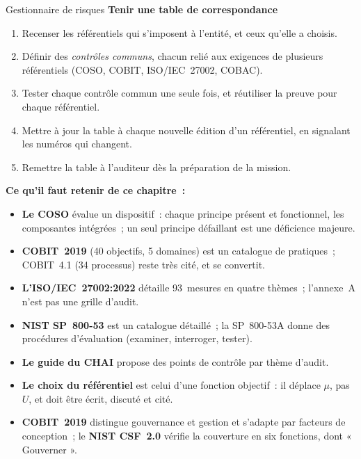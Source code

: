 \begin{boxmetier}{Gestionnaire de risques}
\textbf{Tenir une table de correspondance}
\begin{enumerate}
    \item Recenser les référentiels qui s'imposent à l'entité, et ceux
          qu'elle a choisis.
    \item Définir des \emph{contrôles communs}, chacun relié aux exigences
          de plusieurs référentiels (COSO, COBIT, ISO/IEC~27002, COBAC).
    \item Tester chaque contrôle commun une seule fois, et réutiliser la
          preuve pour chaque référentiel.
    \item Mettre à jour la table à chaque nouvelle édition d'un
          référentiel, en signalant les numéros qui changent.
    \item Remettre la table à l'auditeur dès la préparation de la mission.
\end{enumerate}
\end{boxmetier}


\separateur

\begin{boxresume}
\textbf{Ce qu'il faut retenir de ce chapitre~:}
\begin{itemize}
    \item \textbf{Le COSO} évalue un dispositif~: chaque principe présent et
          fonctionnel, les composantes intégrées~; un seul principe
          défaillant est une déficience majeure.
    \item \textbf{COBIT~2019} (40 objectifs, 5 domaines) est un catalogue de
          pratiques~; COBIT~4.1 (34 processus) reste très cité, et se
          convertit.
    \item \textbf{L'ISO/IEC~27002:2022} détaille 93~mesures en quatre
          thèmes~; l'annexe~A n'est pas une grille d'audit.
    \item \textbf{NIST SP~800-53} est un catalogue détaillé~; la SP~800-53A
          donne des procédures d'évaluation (examiner, interroger, tester).
    \item \textbf{Le guide du CHAI} propose des points de contrôle par thème
          d'audit.
    \item \textbf{Le choix du référentiel} est celui d'une fonction
          objectif~: il déplace $\mu$, pas $U$, et doit être écrit, discuté
          et cité.
    \item \textbf{COBIT~2019} distingue gouvernance et gestion et s'adapte par facteurs de conception~; le \textbf{NIST CSF~2.0} vérifie la couverture en six fonctions, dont « Gouverner ».
\end{itemize}
\end{boxresume}

